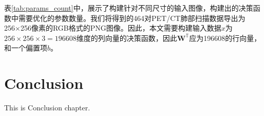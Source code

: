 \documentclass[twocolumn]{article}
\begin{document}
表\ref{tab:params_count}中，展示了构建针对不同尺寸的输入图像，构建出的决策函数中需要优化的参数数量。我们将得到的464对PET/CT肺部扫描数据导出为256×256像素的RGB格式的PNG图像。因此，本文需要构建输入数据$x$为$256 \times 256 \times 3=196608$维度的列向量的决策函数，因此$\mathbf{W}^\mathbb{T}$应为196608的行向量，和一个偏置项$b$。





\section{Conclusion}
This is Conclusion chapter.



\end{document}
